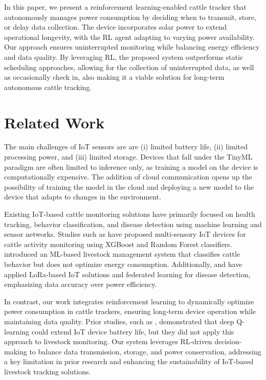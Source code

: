 \documentclass[10pt]{cai}
\begin{document}
In this paper, we present a reinforcement learning-enabled cattle tracker that autonomously manages power consumption by deciding when to transmit, store, or delay data collection. 
The device incorporates solar power to extend operational longevity, with the RL agent adapting to varying power availability. 
Our approach ensures uninterrupted monitoring while balancing energy efficiency and data quality. By leveraging RL, the proposed system outperforms static scheduling approaches, allowing for the collection of uninterrupted data, as well as occasionally check in, also making it a viable solution for long-term autonomous cattle tracking.

\section{Related Work}
The main challenges of IoT sensors are \cite{chenDeepReinforcementLearning2021} are (i) limited battery life, (ii) limited processing power, and (iii) limited storage.
Devices that fall under the TinyML paradigm are often limited to inference only, as training a model on the device is computationally expensive.
The addition of cloud communication opens up the possibility of training the model in the cloud and deploying a new model to the device that adapts to changes in the environment.

Existing IoT-based cattle monitoring solutions have primarily focused on health tracking, behavior classification, and disease detection using machine learning and sensor networks. 
Studies such as \cite{duttaMOOnitorIoTBased2022} have proposed multi-sensory IoT devices for cattle activity monitoring using XGBoost and Random Forest classifiers. 
\cite{yamsaniIoTBasedLivestockMonitoring2024} introduced an ML-based livestock management system that classifies cattle behavior but does not optimize energy consumption. 
Additionally, \cite{arshadFederatedLearningModel2024} and \cite{iRealTimeCattle2024} have applied LoRa-based IoT solutions and federated learning for disease detection, emphasizing data accuracy over power efficiency.

In contrast, our work integrates reinforcement learning to dynamically optimize power consumption in cattle trackers, ensuring long-term device operation while maintaining data quality. 
Prior studies, such as \cite{hribarUsingDeepQLearning2019}, demonstrated that deep Q-learning could extend IoT device battery life, but they did not apply this approach to livestock monitoring. 
Our system leverages RL-driven decision-making to balance data transmission, storage, and power conservation, addressing a key limitation in prior research and enhancing the sustainability of IoT-based livestock tracking solutions.
\end{document}
